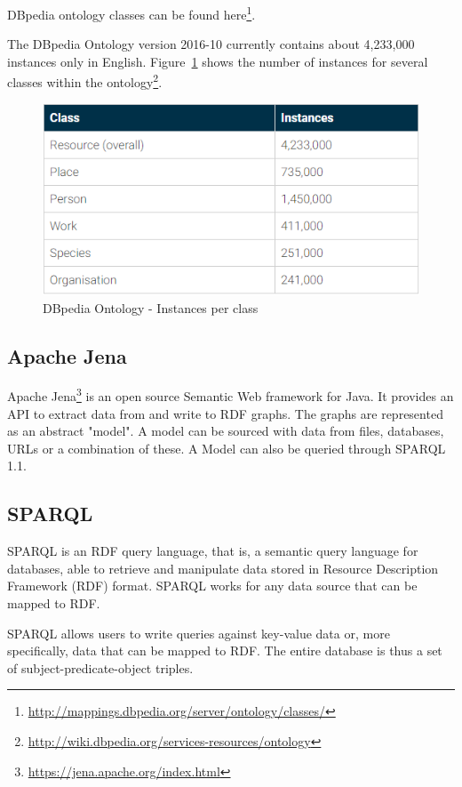 \documentclass[thesis=M,english]{FITthesis}[2018/05/30]
\begin{document}
DBpedia ontology classes can be found here\footnote{\url{http://mappings.dbpedia.org/server/ontology/classes/}}.

The DBpedia Ontology version 2016-10 currently contains about 4,233,000 instances only in English. Figure~\ref{fig:Dbpedia-ontology} shows the number of instances for several classes within the ontology\footnote{\url{http://wiki.dbpedia.org/services-resources/ontology}}.

	\begin{figure}[H]\centering
		\includegraphics[width=\textwidth]{Dbpedia-ontology}
		\caption{DBpedia Ontology - Instances per class}\label{fig:Dbpedia-ontology}
	\end{figure}

\subsection{Apache Jena}\label{ApacheJena}
	Apache Jena\footnote{\url{https://jena.apache.org/index.html}} \cite{wiki:ApacheJena} is an open source Semantic Web framework for Java. It provides an API to extract data from and write to RDF graphs. The graphs are represented as an abstract "model". A model can be sourced with data from files, databases, URLs or a combination of these. A Model can also be queried through SPARQL 1.1.

\subsection{SPARQL}\label{SPARQL}
	SPARQL \cite{master:SPARQL} is an RDF query language, that is, a semantic query language for databases, able to retrieve and manipulate data stored in Resource Description Framework (RDF) format. SPARQL works for any data source that can be mapped to RDF.

	SPARQL allows users to write queries against key-value data or, more specifically, data that can be mapped to RDF. The entire database is thus a set of subject-predicate-object triples.
	
\end{document}
